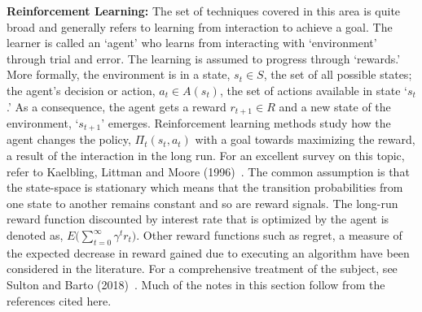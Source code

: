 \noindent\textbf{Reinforcement Learning:} The set of techniques covered in this area is quite broad and generally refers to learning from interaction to achieve a goal. The learner is called an `agent' who learns from interacting with `environment' through trial and error. The learning is assumed to progress through `rewards.' More formally, the environment is in a state, $s_t \in S$, the set of all possible states; the agent's decision or action, $a_t \in A(s_t)$, the set of actions available in state `$s_t$.' As a consequence, the agent gets a reward $r_{t+1} \in R$ and a new state of the environment, `$s_{t+1}$' emerges. Reinforcement learning methods study how the agent changes the policy, $\Pi_t (s_t,a_t)$ with a goal towards maximizing the reward, a result of the interaction in the long run. For an excellent survey on this topic, refer to Kaelbling, Littman and Moore (1996)~\cite{littmanmoor}. The common assumption is that the state-space is stationary which means that the transition probabilities from one state to another remains constant and so are reward signals. The long-run reward function discounted by interest rate that is optimized by the agent is denoted as, $E\big( \sum_{t=0}^\infty \gamma^t r_t \big)$. Other reward functions such as regret, a measure of the expected decrease in reward gained due to executing an algorithm have been considered in the literature. For a comprehensive treatment of the subject, see Sulton and Barto (2018)~\cite{sultonbarto}. Much of the notes in this section follow from the references cited here. \\


